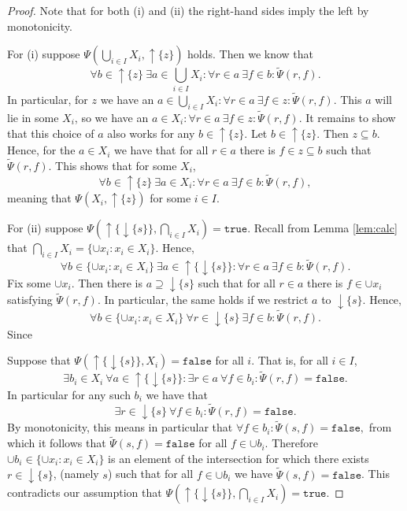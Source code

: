 \documentclass[12pt]{article}
\theoremstyle{definition}
\theoremstyle{plain}
\theoremstyle{plain}
\theoremstyle{plain}
\theoremstyle{plain}
\theoremstyle{remark}
\theoremstyle{remark}
\newcommand{\sub}{\subseteq}
\newcommand{\true}{\mathtt{true}}
\newcommand{\false}{\mathtt{false}}
\newcommand{\upc}[1]{{\uparrow #1}}
\newcommand{\lwc}[1]{{\downarrow #1}}
\begin{document}
\begin{proof}
	Note that for both (i) and (ii) the right-hand sides imply the left by monotonicity. 
	
	For (i) suppose  $\Psi(\bigcup_{i \in I} X_i, \upc{\{z\}})$ holds. Then we know that
	$$\forall b \in \upc{\{z\}} \: \exists a \in \bigcup_{i \in I} X_i: \forall r \in a \: \exists f \in b: \tilde\Psi(r,f).$$
	In particular, for $z$ we have an $a \in \bigcup_{i \in I} X_i: \forall r \in a \: \exists f \in z: \tilde\Psi(r,f).$ This $a$ will lie in some $X_i$, so we have an $a \in X_i: \forall r \in a \: \exists f \in z: \tilde\Psi(r,f).$ It remains to show that this choice of $a$ also works for any $b \in \upc{\{z\}}$. Let $b \in \upc{\{z\}}$. Then $z \sub b$. Hence, for the $a \in X_i$ we have that for all $r \in a$ there is $f \in z \sub b$ such that $\tilde\Psi(r,f)$. This shows that for some $X_i$,
	$$\forall b \in \upc{\{z\}} \: \exists a \in X_i: \forall r \in a \: \exists f \in b: \tilde\Psi(r,f),$$
	meaning that $\Psi(X_i,\upc{\{z\}})$ for some $i \in I$.
	
	For (ii) suppose $\Psi(\upc{\{\lwc{\{s\}}\}}, \bigcap_{i \in I}X_i) = \true$. Recall from Lemma \ref{lem:calc} that $\bigcap_{i \in I}X_i = \{\cup x_i : x_i  \in X_i \}$. Hence,
	$$\forall b \in \{ \cup x_i : x_i \in X_i \}\: \exists a \in \upc{\{\lwc{\{s\}}\}}: \forall r \in a \: \exists f \in b: \tilde\Psi(r,f).$$
	Fix some $\cup x_i$. Then there is $a \supseteq \lwc{\{s\}}$ such that for all $r \in a$ there is $f \in \cup x_i$ satisfying $ \tilde\Psi(r,f)$. In particular, the same holds if we restrict $a$ to $\lwc{\{s\}}$. Hence,
	$$\forall b \in \{ \cup x_i : x_i \in X_i \}\: \forall r \in \lwc{\{s\}} \: \exists f \in b: \tilde\Psi(r,f).$$
	Since 
	
	Suppose that $\Psi(\upc{\{\lwc{\{s\}}\}},X_i) = \false$ for all $i$. That is, for all $i \in I$,
	$$\exists b_i \in X_i \: \forall a \in \upc{\{\lwc{\{s\}}\}}: \exists r \in a \: \forall f \in b_i: \tilde\Psi(r,f) = \false.$$
	In particular for any such $b_i$ we have that
	$$\exists r \in \lwc{\{s\}} \: \forall f \in b_i: \tilde\Psi(r,f) = \false.$$
	By monotonicity, this means in particular that $\forall f \in b_i: \tilde\Psi(s,f) = \false,$
	from which it follows that $\tilde\Psi(s,f) = \false$ for all $f \in \cup b_i$.
	Therefore $\cup b_i \in \{ \cup x_i : x_i \in X_i \}$ is an element of the intersection for which there exists $r \in \lwc{\{s\}}$, (namely $s$) such that for all $f \in \cup b_i$ we have $\tilde\Psi(s,f) = \false$. This contradicts our assumption that $\Psi(\upc{\{\lwc{\{s\}}\}}, \bigcap_{i \in I}X_i) = \true$.
\end{proof}
\end{document}

